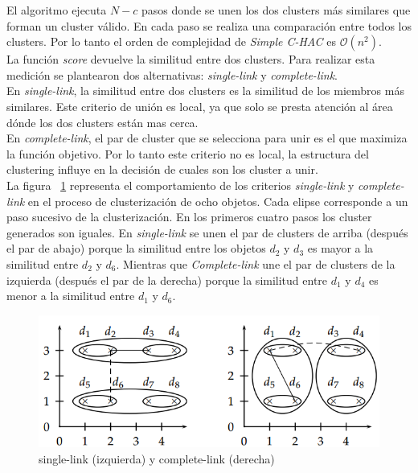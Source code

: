 El algoritmo ejecuta $N - c$ pasos donde se unen los dos clusters más similares que forman un cluster válido. En cada paso se realiza una comparación entre todos los clusters. Por lo tanto el orden de complejidad de \textit{Simple C-HAC} es $\mathcal{O}(n^{2})$.\\

La función \textit{score} devuelve la similitud entre dos clusters. Para realizar esta medición se plantearon dos alternativas: \textit{single-link} y \textit{complete-link}.\\

En \textit{single-link}, la similitud entre dos clusters es la similitud de los miembros más similares. Este criterio de unión es local, ya que solo se presta atención al área dónde los dos clusters están mas cerca.\\

En \textit{complete-link}, el par de cluster que se selecciona para unir es el que maximiza la función objetivo. Por lo tanto este criterio no es local, la estructura del clustering influye en la decisión de cuales son los cluster a unir.\\

La figura ~\ref{des:LinkageCriteria} representa el comportamiento de los criterios \textit{single-link} y \textit{complete-link} en el proceso de clusterización de ocho objetos. Cada elipse corresponde a un paso sucesivo de la clusterización. En los primeros cuatro pasos los cluster generados son iguales. En \textit{single-link} se unen el par de clusters de arriba (después el par de abajo) porque la similitud entre los objetos $d_2$ y $d_3$ es mayor a la similitud entre $d_2$ y $d_6$. Mientras que \textit{Complete-link} une el par de clusters de la izquierda (después el par de la derecha) porque la similitud entre 
 $d_1$ y $d_4$ es menor a la similitud entre $d_1$ y $d_6$.\\

\begin{figure}[H]
  \centering
    \includegraphics[width=1\textwidth]{img/LinkageCriteria.png}
  \caption{single-link (izquierda) y complete-link (derecha)}
  \label{des:LinkageCriteria}
\end{figure}


